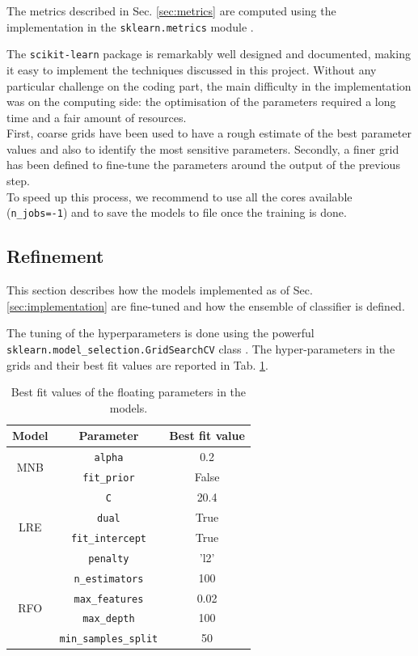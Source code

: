\documentclass[a4paper,12pt]{article} %
\begin{document}
The metrics described in Sec. \ref{sec:metrics} are computed using the
implementation in the \texttt{sklearn.metrics} module \cite{scikit-metrics}.

The \texttt{scikit-learn} package is remarkably well designed and documented,
making it easy to implement the techniques discussed in this project.
Without any particular challenge on the coding part, the main
difficulty in the implementation was on the computing side:
the optimisation of the parameters required a long time and
a fair amount of resources. \\
First, coarse grids have been used to have a rough estimate of the
best parameter values and also to identify the most sensitive parameters.
Secondly, a finer grid has been defined to fine-tune the parameters
around the output of the previous step. \\
To speed up this process, we recommend to use all the cores available (\texttt{n\_jobs=-1})
and to save the models to file once the training is done.


\subsection{Refinement}
\label{sec:refinement}
This section describes how the models implemented as of Sec. \ref{sec:implementation} are
fine-tuned and how the ensemble of classifier is defined.

The tuning of the hyperparameters is done using the powerful\\
\texttt{sklearn.model\_selection.GridSearchCV} class \cite{scikit-gridsearchcv}.
The hyper-parameters in the grids and their best fit values are reported in Tab. \ref{tab:bestfit}.

\begin{table}
\begin{center}
\begin{tabular}{ c | c | c }
\textbf{Model} & \textbf{Parameter} & \textbf{Best fit value} \\ \hline
\multirow{2}{*}{MNB} & \texttt{alpha} & 0.2 \\
 & \texttt{fit\_prior} & False \\ \hline
\multirow{4}{*}{LRE} & \texttt{C} & 20.4 \\
 & \texttt{dual} & True\\
 & \texttt{fit\_intercept} & True\\
 & \texttt{penalty} & 'l2'\\ \hline
\multirow{4}{*}{RFO} & \texttt{n\_estimators} & 100 \\
 & \texttt{max\_features} & 0.02 \\
 & \texttt{max\_depth} & 100 \\
 & \texttt{min\_samples\_split} & 50 \\ \hline
\end{tabular}
\end{center}
\caption{Best fit values of the floating parameters in the models.
\label{tab:bestfit}}
\end{table}
\end{document}
